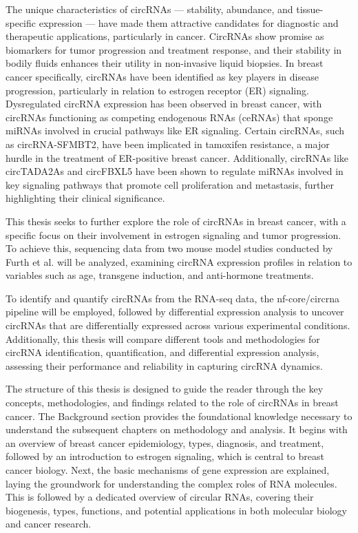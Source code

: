 The unique characteristics of circRNAs — stability, abundance, and
tissue-specific expression — have made them attractive candidates for
diagnostic and therapeutic applications, particularly in cancer.
CircRNAs show promise as biomarkers for tumor progression and treatment
response\supercite{bao_prognostic_2020,ren_construction_2017}, and their
stability in bodily fluids enhances their utility in non-invasive liquid
biopsies\supercite{bao_prognostic_2020,zhang_circular_2018}.
In breast cancer specifically, circRNAs have been identified as key players in
disease progression, particularly in relation to estrogen receptor (ER)
signaling.
Dysregulated circRNA expression has been observed in breast cancer, with
circRNAs functioning as competing endogenous RNAs (ceRNAs) that sponge miRNAs
involved in crucial pathways like ER
signaling\supercite{nair_circular_2016,xu_circrna_2022}.
Certain circRNAs, such as circRNA-SFMBT2, have been implicated in tamoxifen
resistance, a major hurdle in the treatment of ER-positive breast
cancer\supercite{li_circrna-sfmbt2_2023}.
Additionally, circRNAs like circTADA2As and circFBXL5 have been shown to
regulate miRNAs involved in key signaling pathways that promote cell
proliferation and metastasis, further highlighting their clinical
significance\supercite{xu_circtada2as_2019,gao_hsa_circrna_0006528_2019}.

This thesis seeks to further explore the role of circRNAs in breast cancer,
with a specific focus on their involvement in estrogen signaling and tumor
progression.
To achieve this, sequencing data from two mouse model studies conducted by
Furth et al.
\supercite{furth_esr1_2023,furth_overexpression_2023}
will be analyzed, examining circRNA expression profiles in relation to
variables such as age, transgene induction, and anti-hormone treatments.

To identify and quantify circRNAs from the RNA-seq data, the nf-core/circrna
pipeline\supercite{digby_nf-corecircrna_2023} will be employed, followed by
differential expression analysis to uncover circRNAs that are differentially
expressed across various experimental conditions.
Additionally, this thesis will compare different tools and methodologies for
circRNA identification, quantification, and differential expression analysis,
assessing their performance and reliability in capturing circRNA dynamics.

The structure of this thesis is designed to guide the reader through the key
concepts, methodologies, and findings related to the role of circRNAs in breast
cancer.
The Background section provides the foundational knowledge necessary to
understand the subsequent chapters on methodology and analysis.
It begins with an overview of breast cancer epidemiology, types, diagnosis, and
treatment, followed by an introduction to estrogen signaling, which is central
to breast cancer biology.
Next, the basic mechanisms of gene expression are explained, laying the
groundwork for understanding the complex roles of RNA molecules.
This is followed by a dedicated overview of circular RNAs, covering their
biogenesis, types, functions, and potential applications in both molecular
biology and cancer research.

